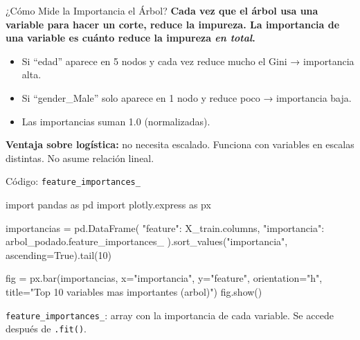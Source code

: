 \documentclass[aspectratio=169, 11pt]{beamer}
\begin{document}
\begin{frame}{¿Cómo Mide la Importancia el Árbol?}
  \vspace{-4pt}
  {\footnotesize\color{arcaDark}\bfseries
    Cada vez que el árbol usa una variable para hacer un corte,
    reduce la impureza. La \textbf{importancia} de una variable es
    cuánto reduce la impureza \textit{en total}.}

  \vspace{6pt}
  {\footnotesize
  \begin{itemize}\setlength{\itemsep}{5pt}
    \item[{\color{arcaRed}\scriptsize\faArrowRight}]
      Si ``edad'' aparece en 5 nodos y cada vez reduce mucho el Gini
      → importancia alta.
    \item[{\color{arcaRed}\scriptsize\faArrowRight}]
      Si ``gender\_Male'' solo aparece en 1 nodo y reduce poco
      → importancia baja.
    \item[{\color{arcaRed}\scriptsize\faArrowRight}]
      Las importancias suman 1.0 (normalizadas).
  \end{itemize}
  }

  \vspace{6pt}
  \begin{tcolorbox}[colback=arcaGray, colframe=arcaRed, boxrule=0.5pt, arc=2pt,
    left=6pt, right=6pt, top=4pt, bottom=4pt]
    {\scriptsize\color{arcaDark}
    \faLightbulb\hspace{4pt}\textbf{Ventaja sobre logística:} no necesita
    escalado. Funciona con variables en escalas distintas.
    No asume relación lineal.}
  \end{tcolorbox}
\end{frame}

\begin{frame}[fragile,shrink=18]{Código: \texttt{feature\_importances\_}}
  \vspace{-6pt}
  \begin{pyblock}
import pandas as pd
import plotly.express as px

importancias = pd.DataFrame({
    "feature": X_train.columns,
    "importancia": arbol_podado.feature_importances_
}).sort_values("importancia", ascending=True).tail(10)

fig = px.bar(importancias, x="importancia", y="feature",
             orientation="h",
             title="Top 10 variables mas importantes (arbol)")
fig.show()
  \end{pyblock}

  \vspace{4pt}
  {\scriptsize\color{textMuted}
    \faArrowRight\hspace{4pt} \texttt{feature\_importances\_}: array con la
    importancia de cada variable. Se accede después de \texttt{.fit()}.}
\end{frame}
\end{document}
